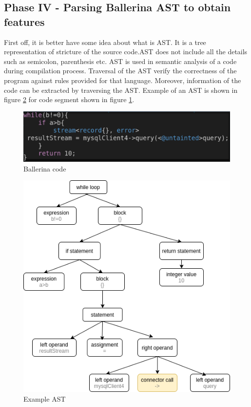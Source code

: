 \subsection{Phase IV - Parsing Ballerina AST to obtain features}\label{phase_iv}

First off, it is better have some idea about what is \acrfull{AST}. It is a tree representation of stricture of the source code.AST does not include all the details such as semicolon, parenthesis etc. AST is used in semantic analysis of a code during compilation process. Traversal of the AST verify the correctness of the program against rules provided for that language. Moreover, information of the code can be extracted by traversing the AST.  Example of an AST is shown in figure \ref{AST_example} for code segment shown in figure \ref{code_for_ast}.

\begin{figure}[htbp]
	\begin{center}
		\includegraphics[scale=0.3]{figures/sample_code_for_ast.png}
	\end{center}
	\caption{Ballerina code}
	\label{code_for_ast}
\end{figure}

\begin{figure}[htbp]
	\begin{center}
		\includegraphics[scale=0.5]{figures/AST example.png}
	\end{center}
	\caption{Example AST}
	\label{AST_example}
\end{figure}

